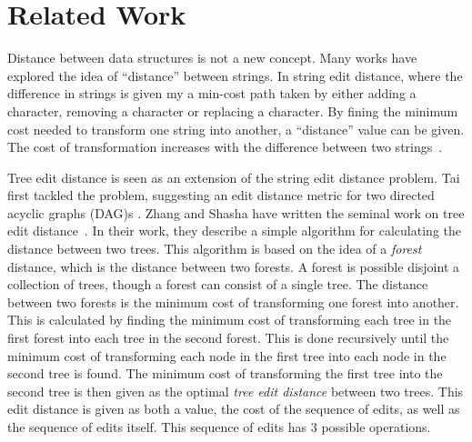 



\section{Related Work}
\label{sec:related-work}

Distance between data structures is not a new concept. Many works have explored the idea of ``distance'' between strings. In string edit distance, where the difference in strings is given my a min-cost path taken by either adding a character, removing a character or replacing a character. By fining the minimum cost needed to transform one string into another, a ``distance'' value can be given. The cost of transformation increases with the difference between two strings~\cite{yujianNormalizedLevenshteinDistance2007, masekFasterAlgorithmComputing1980}.

Tree edit distance is seen as an extension of the string edit distance problem. Tai first tackled the problem, suggesting an edit distance metric for two directed acyclic graphs (DAG)s \cite{tai_tree--tree_1979}. Zhang and Shasha have written the seminal work on tree edit distance~\cite{zhang_simple_1989}. In their work, they describe a simple algorithm for calculating the distance between two trees. This algorithm is based on the idea of a \textit{forest} distance, which is the distance between two forests. A forest is possible disjoint a collection of trees, though a forest can consist of a single tree. The distance between two forests is the minimum cost of transforming one forest into another. This is calculated by finding the minimum cost of transforming each tree in the first forest into each tree in the second forest. This is done recursively until the minimum cost of transforming each node in the first tree into each node in the second tree is found. The minimum cost of transforming the first tree into the second tree is then given as the optimal \emph{tree edit distance} between two trees. This edit distance is given as both a value, the cost of the sequence of edits, as well as the sequence of edits itself. This sequence of edits has 3 possible operations.

